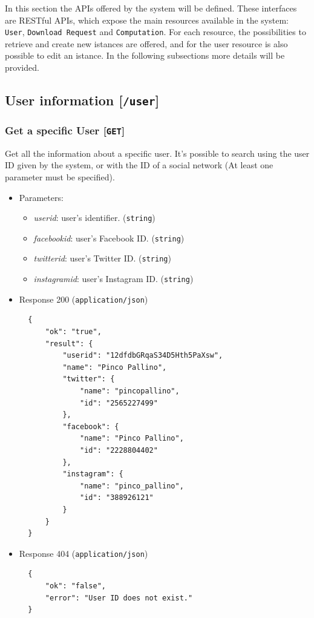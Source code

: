 In this section the APIs offered by the system will be defined. These interfaces are RESTful APIs, which expose the main resources available in the system: \texttt{User}, \texttt{Download Request} and \texttt{Computation}. For each resource, the possibilities to retrieve and create new istances are offered, and for the user resource is also possible to edit an istance. In the following subsections more details will be provided. 

\subsection{User information {[}\protect\texttt{/user}{]}}
\label{sec:APIuser}

\subsubsection{Get a specific User {[}\protect\texttt{GET}{]}}

Get all the information about a specific user. It's possible to search using the user ID given by the system, or with the ID of a social network (At least one parameter must be specified).

\begin{itemize}
\item
  Parameters:

  \begin{itemize}
  \item
    \textit{userid}: user's identifier. (\texttt{string})
  \item
    \textit{facebookid}: user's Facebook ID. (\texttt{string})
  \item
    \textit{twitterid}: user's Twitter ID. (\texttt{string})
  \item
    \textit{instagramid}: user's Instagram ID. (\texttt{string})
  \end{itemize}
\item
  Response 200 (\texttt{application/json})

\begin{verbatim}
  {
      "ok": "true",
      "result": {
          "userid": "12dfdbGRqaS34D5Hth5PaXsw",
          "name": "Pinco Pallino",
          "twitter": {
              "name": "pincopallino",
              "id": "2565227499"
          },
          "facebook": {
              "name": "Pinco Pallino",
              "id": "2228804402"
          },
          "instagram": {
              "name": "pinco_pallino",
              "id": "388926121"
          }
      }
  }
\end{verbatim}
\item
  Response 404 (\texttt{application/json})

\begin{verbatim}
  {
      "ok": "false",
      "error": "User ID does not exist."
  }
\end{verbatim}
\end{itemize}

